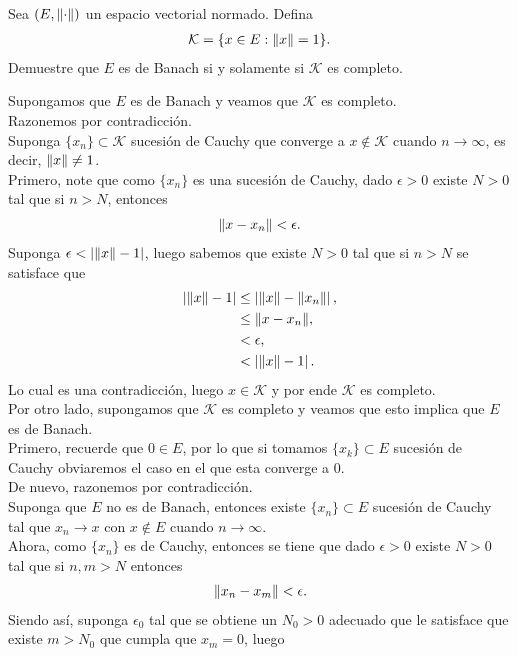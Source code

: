\begin{homeworkProblem}
  Sea $(E,\lVert\cdot\rVert)$ un espacio vectorial normado. Defina
  \begin{align*}
    \mathcal{K}=\{x\in E:\lVert x\rVert=1\}.
  \end{align*}
  Demuestre que $E$ es de Banach si y solamente si $\mathcal{K}$ es completo. 
  \begin{solution}
    Supongamos que $E$ es de Banach y veamos que $\mathcal{K}$ es completo.\\
    Razonemos por contradicción.\\
    Suponga $\{x_n\}\subset \mathcal{K}$ sucesión de Cauchy que converge a $x\notin \mathcal{K}$ cuando $n\to\infty$, es decir, $\lVert x\rVert\neq 1$.\\
    Primero, note que como $\{x_n\}$ es una sucesión de Cauchy, dado $\epsilon>0$ existe $N>0$ tal que si $n>N$, entonces 
    \begin{align*}
      \lVert x-x_n\rVert<\epsilon.
    \end{align*}
    Suponga $\epsilon<\left|\lVert x\rVert-1\right|$, luego sabemos que existe $N>0$ tal que si $n>N$ se satisface que 
    \begin{align*}
      \left| \lVert x\rVert-1 \right|&\leq\left| \lVert x\rVert-\lVert x_n\rVert \right|,\\
      &\leq\lVert x-x_n\rVert,\\
      &< \epsilon,\\
      &< \left| \lVert x\rVert-1 \right|.
    \end{align*}
    Lo cual es una contradicción, luego $x\in\mathcal{K}$ y por ende $\mathcal{K}$ es completo.\\
    Por otro lado, supongamos que $\mathcal{K}$ es completo y veamos que esto implica que $E$ es de Banach.\\
    Primero, recuerde que $0\in E$, por lo que si tomamos $\{x_k\}\subset E$ sucesión de Cauchy obviaremos el caso en el que esta converge a $0$.\\ 
    De nuevo, razonemos por contradicción.\\
    Suponga que $E$ no es de Banach, entonces existe $\{x_n\}\subset E$ sucesión de Cauchy tal que $x_n\to x$ con $x\notin E$ cuando $n\to\infty$.\\
    Ahora, como $\{x_n\}$ es de Cauchy, entonces se tiene que dado $\epsilon>0$ existe $N>0$ tal que si $n,m>N$ entonces
    \begin{align*}
      \lVert x_n-x_m\rVert<\epsilon.
    \end{align*}
    Siendo así, suponga $\epsilon_0$ tal que se obtiene un $N_0>0$ adecuado que le satisface que existe $m>N_0$ que cumpla que $x_m=0$, luego

\end{solution}
\end{homeworkProblem}
